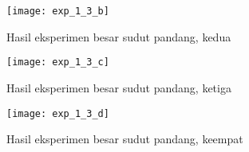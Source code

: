 \begin{figure}[H]
	\centering  
	\texttt{[image: exp\_1\_3\_b]}
	\caption[Hasil eksperimen besar sudut pandang, kedua]{Hasil eksperimen besar sudut pandang, kedua}
	\label{fig:exp_1_3_b}
\end{figure}

\begin{figure}[H]
	\centering  
	\texttt{[image: exp\_1\_3\_c]}
	\caption[Hasil eksperimen besar sudut pandang, ketiga]{Hasil eksperimen besar sudut pandang, ketiga}
	\label{fig:exp_1_3_c}
\end{figure}

\begin{figure}[H]
	\centering  
	\texttt{[image: exp\_1\_3\_d]}
	\caption[Hasil eksperimen besar sudut pandang, keempat]{Hasil eksperimen besar sudut pandang, keempat}
	\label{fig:exp_1_3_d}
\end{figure}